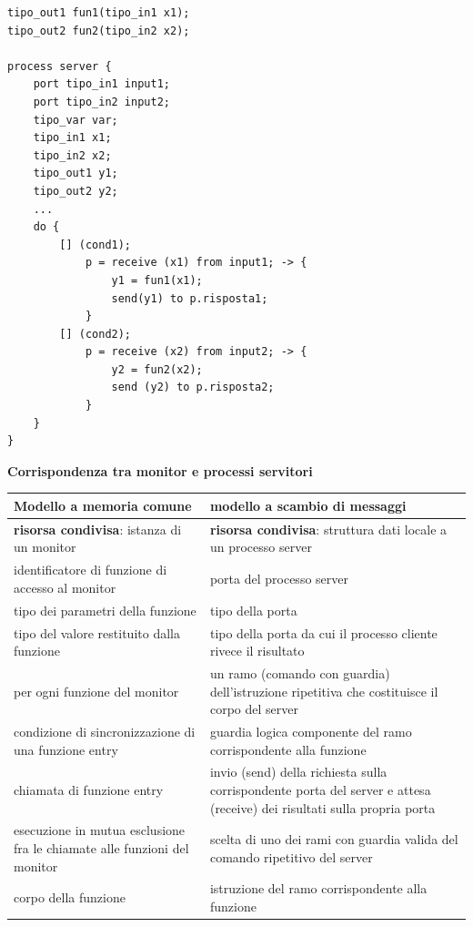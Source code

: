 \documentclass{article}
\begin{document}
\begin{lstlisting}
tipo_out1 fun1(tipo_in1 x1);
tipo_out2 fun2(tipo_in2 x2);

process server {
    port tipo_in1 input1;
    port tipo_in2 input2;
    tipo_var var;
    tipo_in1 x1;
    tipo_in2 x2;
    tipo_out1 y1;
    tipo_out2 y2;
    ...
    do {
        [] (cond1);
            p = receive (x1) from input1; -> {
                y1 = fun1(x1);
                send(y1) to p.risposta1;
            }
        [] (cond2);
            p = receive (x2) from input2; -> {
                y2 = fun2(x2);
                send (y2) to p.risposta2;
            }
    }
}
\end{lstlisting}

\vspace{3mm}
\textbf{Corrispondenza tra monitor e processi servitori}
\begin{center}
\begin{tabular}{||p{6cm}|p{6cm}||}
    \hline
    \textbf{Modello a memoria comune} & \textbf{modello a scambio di messaggi} \\
    \hline
    \textbf{risorsa condivisa}: istanza di un monitor & \textbf{risorsa condivisa}: struttura dati locale a un processo server \\
    \hline
    identificatore di funzione di accesso al monitor & porta del processo server \\
    \hline
    tipo dei parametri della funzione & tipo della porta \\
    \hline
    tipo del valore restituito dalla funzione & tipo della porta da cui il processo cliente rivece il risultato \\
    \hline
    per ogni funzione del monitor & un ramo (comando con guardia) dell'istruzione ripetitiva che costituisce il corpo del server \\
    \hline
    condizione di sincronizzazione di una funzione entry & guardia logica componente del ramo corrispondente alla funzione \\
    \hline
    chiamata di funzione entry & invio (send) della richiesta sulla corrispondente porta del server e attesa (receive) dei risultati sulla propria porta \\
    \hline
    esecuzione in mutua esclusione fra le chiamate alle funzioni del monitor & scelta di uno dei rami con guardia valida del comando ripetitivo del server \\
    \hline
    corpo della funzione & istruzione del ramo corrispondente alla funzione \\
    \hline
\end{tabular}
\end{center}
\end{document}
